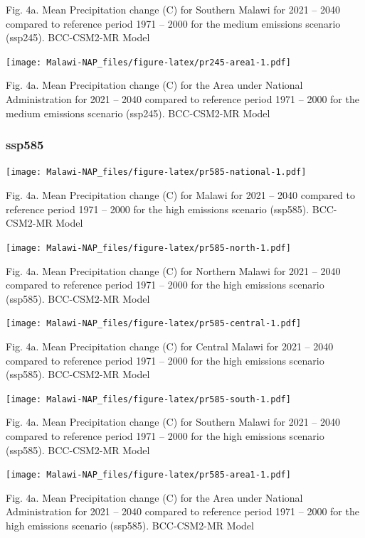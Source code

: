 \documentclass[
]{book}
\begin{document}
Fig. 4a. Mean Precipitation change (C) for Southern Malawi for 2021 -- 2040 compared to reference period 1971 -- 2000 for the medium emissions scenario (ssp245). BCC-CSM2-MR Model

\texttt{[image: Malawi-NAP\_files/figure-latex/pr245-area1-1.pdf]}

Fig. 4a. Mean Precipitation change (C) for the Area under National Administration for 2021 -- 2040 compared to reference period 1971 -- 2000 for the medium emissions scenario (ssp245). BCC-CSM2-MR Model

\hypertarget{ssp585-1}{%
\subsubsection{ssp585}\label{ssp585-1}}

\texttt{[image: Malawi-NAP\_files/figure-latex/pr585-national-1.pdf]}

Fig. 4a. Mean Precipitation change (C) for Malawi for 2021 -- 2040 compared to reference period 1971 -- 2000 for the high emissions scenario (ssp585). BCC-CSM2-MR Model

\texttt{[image: Malawi-NAP\_files/figure-latex/pr585-north-1.pdf]}

Fig. 4a. Mean Precipitation change (C) for Northern Malawi for 2021 -- 2040 compared to reference period 1971 -- 2000 for the high emissions scenario (ssp585). BCC-CSM2-MR Model

\texttt{[image: Malawi-NAP\_files/figure-latex/pr585-central-1.pdf]}

Fig. 4a. Mean Precipitation change (C) for Central Malawi for 2021 -- 2040 compared to reference period 1971 -- 2000 for the high emissions scenario (ssp585). BCC-CSM2-MR Model

\texttt{[image: Malawi-NAP\_files/figure-latex/pr585-south-1.pdf]}

Fig. 4a. Mean Precipitation change (C) for Southern Malawi for 2021 -- 2040 compared to reference period 1971 -- 2000 for the high emissions scenario (ssp585). BCC-CSM2-MR Model

\texttt{[image: Malawi-NAP\_files/figure-latex/pr585-area1-1.pdf]}

Fig. 4a. Mean Precipitation change (C) for the Area under National Administration for 2021 -- 2040 compared to reference period 1971 -- 2000 for the high emissions scenario (ssp585). BCC-CSM2-MR Model
\end{document}
